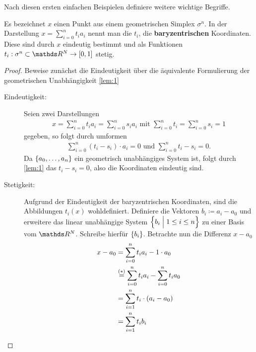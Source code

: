 
Nach diesen ersten einfachen Beispielen definiere weitere wichtige
Begriffe.

\begin{Lem}
  \normalfont Es bezeichnet $x$ einen Punkt aus einem geometrischen
  Simplex $\sigma^n$. In der Darstellung
  $x = \sum\limits_{i=0}^n t_i a_i$ nennt man die $t_i$, die
  \textbf{baryzentrischen} Koordinaten. Diese sind durch $x$ eindeutig
  bestimmt und als Funktionen
  $t_i : \sigma^n \subset \R^N \rightarrow [0,1]$ stetig.
  \begin{proof}
    Beweise zunächst die Eindeutigkeit über die äquivalente
    Formulierung der geometrischen Unabhängigkeit \cref{lem:1}
    \begin{description}
    \item[Eindeutigkeit: ] Seien zwei Darstellungen
      \begin{gather*}
        x = \sum\limits_{i=0}^n t_i a_i = \sum\limits_{i=0}^n s_i a_i
        \text{ mit } \sum\limits_{i=0}^n t_i = \sum\limits_{i=0}^n s_i
        = 1
      \end{gather*}
      gegeben, so folgt durch umformen
      \begin{gather*}
        \sum\limits_{i=0}^n (t_i - s_i ) \cdot a_i = 0 \text{ und }
        \sum\limits_{i=0}^n t_i - s_i = 0.
      \end{gather*}
      Da $\left\{ a_0 , \ldots , a_n \right\}$ ein geometrisch unabhängiges
      System ist, folgt durch \cref{lem:1} das $t_i - s_i = 0$, also
      die Koordinaten eindeutig sind.
    \item[Stetigkeit: ] Aufgrund der Eindeutigkeit der baryzentrischen
      Koordinaten, sind die Abbildungen $t_i (x)$ wohldefiniert.
      Definiere die Vektoren $b_i \coloneqq a_i - a_0$ und erweitere
      das linear unabhängige System $\left\{  b_i  \; \Big| \;  1 \leq i \leq n \right\}$ zu
      einer Basis vom $\R^N$. Schreibe hierfür $\left\{  b_i
       \right\}$. Betrachte nun die Differenz $x - a_0$
      \begin{align*}
        x - a_0 &= \sp{0}{n} t_i a_i - 1 \cdot a_0\\
                &\overset{(*)}{=} \sp{0}{n} t_i a_i - \sp{0}{n} t_i a_0\\
                &= \sp{1}{n} t_i \cdot (a_i - a_0)\\
                &= \sp{1}{n} t_i b_i\\

\end{align*}
\end{description}
\end{proof}
\end{Lem}
